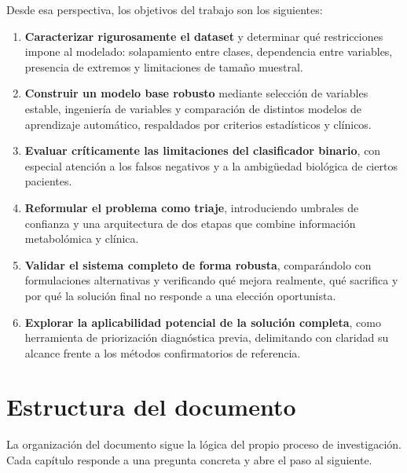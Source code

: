 Desde esa perspectiva, los objetivos del trabajo son los siguientes:

\begin{enumerate}
    \item \textbf{Caracterizar rigurosamente el dataset} y determinar qué restricciones impone al modelado: solapamiento entre clases, dependencia entre variables, presencia de extremos y limitaciones de tamaño muestral.
    \item \textbf{Construir un modelo base robusto} mediante selección de variables estable, ingeniería de variables y comparación de distintos modelos de aprendizaje automático, respaldados por criterios estadísticos y clínicos.
    \item \textbf{Evaluar críticamente las limitaciones del clasificador binario}, con especial atención a los falsos negativos y a la ambigüedad biológica de ciertos pacientes.
    \item \textbf{Reformular el problema como triaje}, introduciendo umbrales de confianza y una arquitectura de dos etapas que combine información metabolómica y clínica.
    \item \textbf{Validar el sistema completo de forma robusta}, comparándolo con formulaciones alternativas y verificando qué mejora realmente, qué sacrifica y por qué la solución final no responde a una elección oportunista.
    \item \textbf{Explorar la aplicabilidad potencial de la solución completa}, como herramienta de priorización diagnóstica previa, delimitando con claridad su alcance frente a los métodos confirmatorios de referencia.
\end{enumerate}

\section{Estructura del documento}

La organización del documento sigue la lógica del propio proceso de investigación. Cada capítulo responde a una pregunta concreta y abre el paso al siguiente.

